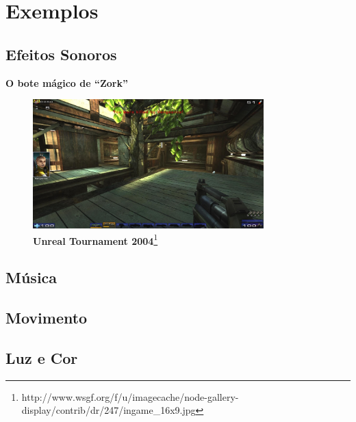 \expandafter\documentclass\expandafter[table, usenames, svgnames, dvipsnames, \classopts]{beamer}
\begin{document}
\section{Exemplos}

\subsection{Efeitos Sonoros}
\begin{frame}{\textbf{O bote mágico de ``Zork''}}
	\centering
	\begin{figure}
        \includegraphics[height=5cm]{taunt}
        \caption{\scriptsize\textbf{Unreal Tournament 2004}\footnote{http://www.wsgf.org/f/u/imagecache/node-gallery-display/contrib/dr/247/ingame\_16x9.jpg}}
	\end{figure}
\end{frame}

\subsection{Música}

\subsection{Movimento}

\subsection{Luz e Cor}


\end{document}
